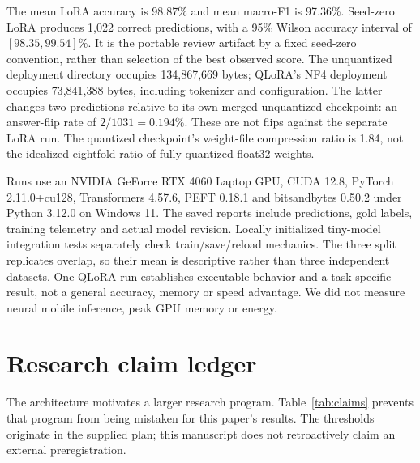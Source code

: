\documentclass[11pt,a4paper]{article}
\begin{document}
The mean LoRA accuracy is 98.87\% and mean macro-F1 is 97.36\%.
Seed-zero LoRA produces 1,022 correct predictions, with a 95\% Wilson accuracy
interval of $[98.35,99.54]\%$. It is the portable review artifact by a fixed
seed-zero convention, rather than selection of the best observed score.
The unquantized deployment directory occupies 134,867,669 bytes; QLoRA's NF4
deployment occupies 73,841,388 bytes, including tokenizer and configuration.
The latter changes two predictions relative to its own merged unquantized
checkpoint: an answer-flip rate of $2/1031=0.194\%$. These are not flips against
the separate LoRA run. The quantized checkpoint's weight-file compression ratio
is 1.84, not the idealized eightfold ratio of fully quantized float32 weights.

Runs use an NVIDIA GeForce RTX 4060 Laptop GPU, CUDA 12.8, PyTorch
2.11.0+cu128, Transformers 4.57.6, PEFT 0.18.1 and bitsandbytes 0.50.2
under Python 3.12.0 on Windows 11. The saved reports include predictions,
gold labels, training telemetry and actual model revision. Locally initialized
tiny-model integration tests separately check train/save/reload mechanics.
The three split replicates overlap, so their mean is descriptive rather than
three independent datasets. One QLoRA run establishes executable behavior and
a task-specific result, not a general accuracy, memory or speed advantage.
We did not measure neural mobile inference, peak GPU memory or energy.

\section{Research claim ledger}
The architecture motivates a larger research program. Table~\ref{tab:claims}
prevents that program from being mistaken for this paper's results. The thresholds
originate in the supplied plan; this manuscript does not retroactively claim an
external preregistration.
\end{document}
